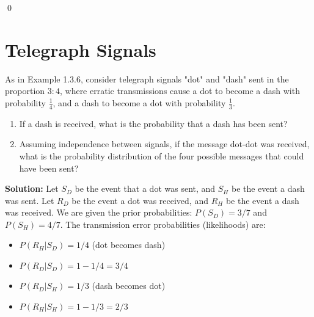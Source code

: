 \qed
\section{Telegraph Signals}

\begin{problembox}
As in Example 1.3.6, consider telegraph signals "dot" and "dash" sent in the proportion $3:4$, where erratic transmissions cause a dot to become a dash with probability $\frac{1}{4}$, and a dash to become a dot with probability $\frac{1}{3}$.
\begin{enumerate}[label=(\alph*)]
    \item If a dash is received, what is the probability that a dash has been sent?
    \item Assuming independence between signals, if the message dot-dot was received, what is the probability distribution of the four possible messages that could have been sent?
\end{enumerate}
\end{problembox}

\noindent\textbf{Solution:}
Let $S_D$ be the event that a dot was sent, and $S_H$ be the event a dash was sent.
Let $R_D$ be the event a dot was received, and $R_H$ be the event a dash was received.
We are given the prior probabilities: $P(S_D) = 3/7$ and $P(S_H) = 4/7$.
The transmission error probabilities (likelihoods) are:
\begin{itemize}
    \item $P(R_H|S_D) = 1/4$ (dot becomes dash)
    \item $P(R_D|S_D) = 1 - 1/4 = 3/4$
    \item $P(R_D|S_H) = 1/3$ (dash becomes dot)
    \item $P(R_H|S_H) = 1 - 1/3 = 2/3$
\end{itemize}

